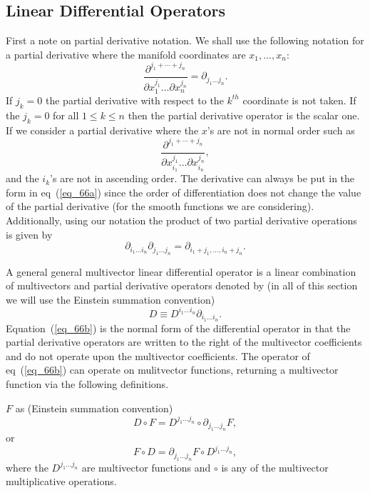 \documentclass[12pt]{report}
\newcommand{\bfrac}[2]{\displaystyle\frac{#1}{#2}}
\newcommand{\be}{\begin{equation}}
\newcommand{\ee}{\end{equation}}
\begin{document}
\subsection{Linear Differential Operators}\label{ldops}

First a note on partial derivative notation.  We shall use the following notation for a partial derivative where
the manifold coordinates are $x_{1},\dots,x_{n}$:
\be\label{eq_66a}
	\bfrac{\partial^{j_{1}+\cdots+j_{n}}}{\partial x_{1}^{j_{1}}\dots\partial x_{n}^{j_{n}}} = \partial_{j_{1}\dots j_{n}}.
\ee
If $j_{k}=0$ the partial derivative with respect to the $k^{th}$ coordinate is not taken.  If the $j_{k} = 0$ for all
$1 \le k \le n$ then the partial derivative operator is the scalar one.  If we consider a partial derivative where the $x$'s are
not in normal order such as
\begin{equation*}
	\bfrac{\partial^{j_{1}+\cdots+j_{n}}}{\partial x_{i_{1}}^{j_{1}}\dots\partial x_{i_{n}}^{j_{n}}}, 
\end{equation*}
and the $i_{k}$'s are not in ascending order.  The derivative can always be  put in the form in eq~(\ref{eq_66a}) since the order
of differentiation does not change the value of the partial derivative (for the smooth functions we are considering). 
Additionally, using our notation the product of two partial derivative operations is given by
\be
	\partial_{i_{1}\dots i_{n}}\partial_{j_{1}\dots j_{n}} = \partial_{i_{1}+j_{1},\dots, i_{n}+j_{n}}.
\ee 

A general general multivector linear differential operator is a linear combination of multivectors and partial derivative operators
denoted by (in all of this section we will use the Einstein summation convention) 
\be\label{eq_66b}
	D \equiv D^{i_{1}\dots i_{n}}\partial_{i_{1}\dots i_{n}}.
\ee
Equation~(\ref{eq_66b}) is the normal form of the differential operator in that the partial derivative operators are written to the right
of the multivector coefficients and do not operate upon the multivector coefficients.
The operator of eq~(\ref{eq_66b}) can operate on mulitvector functions, returning a multivector function via the following definitions.


$F$ as (Einstein summation convention)
\be\label{eq_67a}
	D\circ F = D^{j_{1}\dots j_{n}}\circ\partial_{j_{1}\dots j_{n}}F,
\ee
or
\be\label{eq_68a}
	F\circ D = \partial_{j_{1}\dots j_{n}}F\circ D^{j_{1}\dots j_{n}},
\ee
where the $D^{j_{1}\dots j_{n}}$ are multivector functions and $\circ$ is any of the multivector multiplicative operations.
\end{document}
